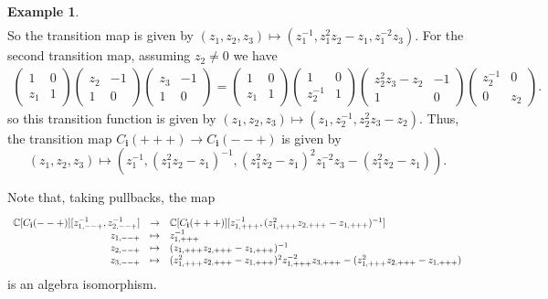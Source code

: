 \documentclass[a4paper, 11pt]{amsart}
\newcommand{\word}[1]{\mathbf{#1}}
\newcommand{\C}{\mathbb{C}}
\theoremstyle{definition}
\newtheorem{example}[theorem]{Example}
\begin{document}
\begin{example}
\[\begin{array}{rl}
\end{array}
\]
So the transition map is given by $(z_1, z_2, z_3) \mapsto (z_1^{-1}, z_1^{2}z_2 - z_1, z_1^{-2}z_3)$. For the second transition map, assuming $z_2 \neq 0$ we have
\[
\begin{array}{rl}
\begin{pmatrix} 1 & 0 \\ z_1 & 1\end{pmatrix} \begin{pmatrix} z_2 & -1 \\ 1 & 0\end{pmatrix} \begin{pmatrix} z_3 & -1 \\ 1 & 0\end{pmatrix} = \begin{pmatrix} 1 & 0 \\ z_1 & 1\end{pmatrix} 
\begin{pmatrix} 1 & 0 \\ z_2^{-1} & 1\end{pmatrix}\begin{pmatrix} z_2^2z_3 - z_2 & -1 \\ 1 & 0\end{pmatrix}\begin{pmatrix} z_2^{-1} & 0 \\ 0 & z_2\end{pmatrix}.
\end{array} 
\]
so this transition function is given by $(z_1, z_2, z_3) \mapsto (z_1, z_2^{-1}, z_2^2z_3 - z_2)$. Thus, the transition map $C_{\word{i}}(+++) \to C_{\word{i}}(--+)$ is given by
\[
(z_1, z_2, z_3) \mapsto (z_1^{-1}, (z_1^{2}z_2 - z_1)^{-1}, (z_1^{2}z_2 - z_1)^2z_1^{-2}z_3 - (z_1^2z_2 - z_1)). 
\]

Note that, taking pullbacks, the map 
\[
\begin{array}[t]{rcl}
\C[C_{\word{i}}(--+)][z_{1,--+}^{-1}, z_{2,--+}^{-1}] &\to & \C[C_{\word{i}}(+++)][z_{1,+++}^{-1}, (z_{1,+++}^{2}z_{2,+++} - z_{1,+++})^{-1}] \\
z_{1,--+} & \mapsto  & z_{1,+++}^{-1} \\
z_{2, --+} & \mapsto & (z_{1,+++}z_{2,+++} - z_{1,+++})^{-1} \\
z_{3,--+} & \mapsto &  (z_{1,+++}^{2}z_{2,+++} - z_{1,+++})^2z_{1,+++}^{-2}z_{3,+++} - (z_{1,+++}^2z_{2,+++} - z_{1,+++})
\end{array}
\]
is an algebra isomorphism. 
\end{example}
\end{document}
